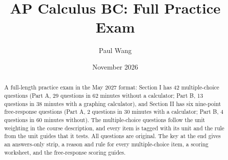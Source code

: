 \documentclass{apcalc}
\title{AP Calculus BC: Full Practice Exam}
\author{Paul Wang}
\date{November 2026}
\begin{document}
\maketitle
\begin{abstract}
A full-length practice exam in the May 2027 format: Section I has 42 multiple-choice questions (Part A, 29 questions in 62 minutes without a calculator; Part B, 13 questions in 38 minutes with a graphing calculator), and Section II has six nine-point free-response questions (Part A, 2 questions in 30 minutes with a calculator; Part B, 4 questions in 60 minutes without). The multiple-choice questions follow the unit weighting in the course description, and every item is tagged with its unit and the rule from the unit guides that it tests. All questions are original. The key at the end gives an answers-only strip, a reason and rule for every multiple-choice item, a scoring worksheet, and the free-response scoring guides.
\end{abstract}
\end{document}

